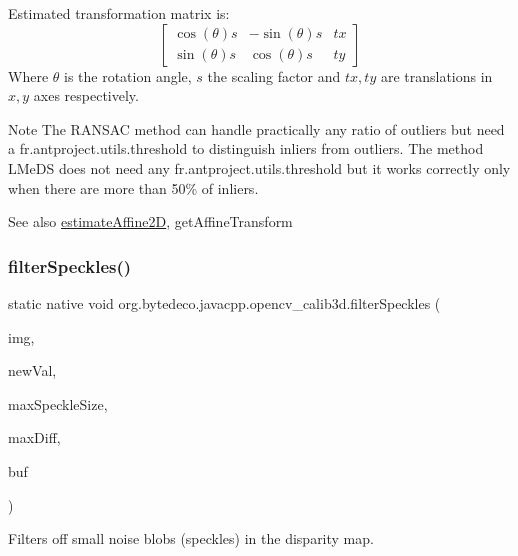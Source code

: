 Estimated transformation matrix is\+: \[ \begin{bmatrix} \cos(\theta)s & -\sin(\theta)s & tx \\ \sin(\theta)s & \cos(\theta)s & ty \end{bmatrix} \] Where $ \theta $ is the rotation angle, $ s $ the scaling factor and $ tx, ty $ are translations in $ x, y $ axes respectively. 

\begin{DoxyNote}{Note}
The R\+A\+N\+S\+AC method can handle practically any ratio of outliers but need a fr.antproject.utils.threshold to distinguish inliers from outliers. The method L\+Me\+DS does not need any fr.antproject.utils.threshold but it works correctly only when there are more than 50\% of inliers.
\end{DoxyNote}
\begin{DoxySeeAlso}{See also}
\hyperlink{group__calib3d_ga3ac5c98614a2c26448c68e407388473f}{estimate\+Affine2D}, get\+Affine\+Transform 
\end{DoxySeeAlso}
\mbox{\label{group__calib3d_ga18894b69acb224417c0f0a1afaded536}} 
\subsubsection{\texorpdfstring{filter\+Speckles()}{filterSpeckles()}}
{\footnotesize\ttfamily static native void org.\+bytedeco.\+javacpp.\+opencv\+\_\+calib3d.\+filter\+Speckles (\begin{DoxyParamCaption}\item[{@By\+Val Mat}]{img,  }\item[{double}]{new\+Val,  }\item[{int}]{max\+Speckle\+Size,  }\item[{double}]{max\+Diff,  }\item[{@By\+Val(null\+Value=\char`\"{}cv\+::\+Input\+Output\+Array(cv\+::no\+Array())\char`\"{}) Mat}]{buf }\end{DoxyParamCaption})\hspace{0.3cm}{\ttfamily [static]}}



Filters off small noise blobs (speckles) in the disparity map. 


